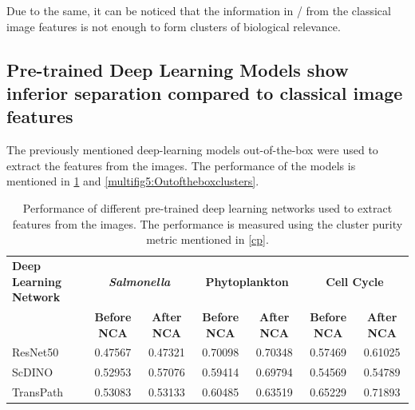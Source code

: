\documentclass[12pt,a4paper]{article}
\begin{document}
Due to the same, it can be noticed that the information in / from the classical image features is not enough to form clusters of biological relevance.

\subsection{Pre-trained Deep Learning Models show inferior separation compared to classical image features}
The previously mentioned deep-learning models out-of-the-box were used to extract the features from the images. The performance of the models is mentioned in \ref{tab:performanceofdl} and \ref{multifig5:Outoftheboxclusters}.


\begin{table}[h]
\centering
\footnotesize
\caption{Performance of different pre-trained deep learning networks used to extract features from the images. The performance is measured using the cluster purity metric mentioned in \ref{cp}.}
\label{tab:performanceofdl}
\begin{tabular}{@{}p{1.8cm}cccccc@{}}
\toprule
\textbf{Deep Learning Network} & \multicolumn{2}{c}{\textbf{\textit{Salmonella}}} & \multicolumn{2}{c}{\textbf{Phytoplankton}} & \multicolumn{2}{c}{\textbf{Cell Cycle}} \\
& \textbf{Before NCA} & \textbf{After NCA} & \textbf{Before NCA} & \textbf{After NCA} & \textbf{Before NCA} & \textbf{After NCA} \\
\midrule
ResNet50 & 0.47567 & 0.47321 & 0.70098 & 0.70348 & 0.57469 & 0.61025 \\
ScDINO  & 0.52953 & 0.57076 & 0.59414 & 0.69794 & 0.54569 & 0.54789 \\
TransPath & 0.53083 & 0.53133 & 0.60485 & 0.63519 & 0.65229 & 0.71893 \\
\bottomrule
\end{tabular}
\end{table}
\end{document}
